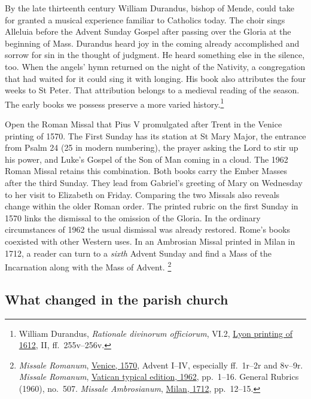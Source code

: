 By the late thirteenth century William Durandus, bishop of Mende, could
take for granted a musical experience familiar to Catholics today. The choir
sings Alleluia before the Advent Sunday Gospel after passing over the Gloria
at the beginning of Mass. Durandus heard joy in the coming already accomplished
and sorrow for sin in the thought of judgment. He heard something else in the
silence, too. When the angels' hymn returned on the night of the Nativity,
a congregation that had waited for it could sing it with longing. His book
also attributes the four weeks to St Peter. That attribution belongs to a
medieval reading of the season. The early books we possess preserve a more
varied history.\footnote{William Durandus, \emph{Rationale divinorum
officiorum}, VI.2, \href{https://archive.org/details/rationalediuinor02dura}{Lyon printing of 1612},
II, ff.~255v--256v.}

Open the Roman Missal that Pius V promulgated after Trent in the Venice
printing of 1570. The First Sunday has its station at St Mary Major, the
entrance from Psalm 24 (25 in modern numbering), the prayer asking the Lord
to stir up his power, and Luke's Gospel of the Son of Man coming in a cloud.
The 1962 Roman Missal retains this combination. Both books carry the Ember
Masses after the third Sunday. They lead from Gabriel's greeting of Mary on
Wednesday to her visit to Elizabeth on Friday. Comparing the two Missals
also reveals change within the older Roman order. The printed rubric on
the first Sunday in 1570 links the dismissal to the omission of the Gloria.
In the ordinary circumstances of 1962 the usual dismissal was already
restored. Rome's books coexisted with other Western uses. In an Ambrosian
Missal printed in Milan in 1712, a reader can turn to a \emph{sixth} Advent
Sunday and find a Mass of the Incarnation along with the Mass of Advent.
\footnote{\emph{Missale Romanum}, \href{https://archive.org/details/messale-tridentino-di-san-pio-v-1570}{Venice, 1570},
Advent I--IV, especially ff.~1r--2r and 8v--9r. \emph{Missale Romanum},
\href{https://musicasacra.com/pdf/missale62.pdf}{Vatican typical edition, 1962},
pp.~1--16. General Rubrics (1960), no.~507. \emph{Missale Ambrosianum},
\href{https://archive.org/details/10869665bsb}{Milan, 1712}, pp.~12--15.}

\subsection{What changed in the parish church}

